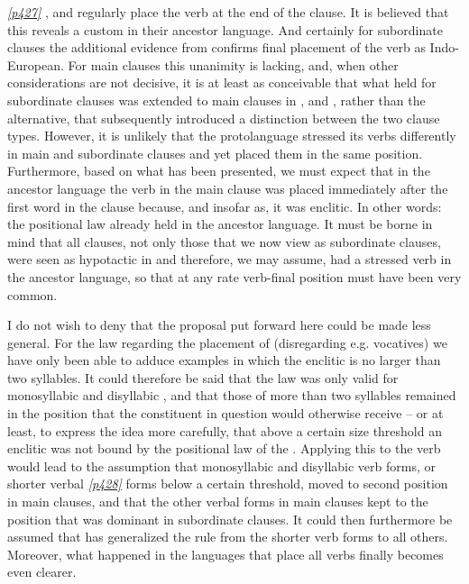 \hyperlink{p427}{\emph{[p427]}} ,  and  regularly place the verb at the end of the clause. It is believed that this reveals a custom in their ancestor language. And certainly for subordinate clauses the additional evidence from  confirms final placement of the verb as Indo-European. For main clauses this unanimity is lacking, and, when other considerations are not decisive, it is at least as conceivable that what held for subordinate clauses was extended to main clauses in ,  and , rather than the alternative, that  subsequently introduced a distinction between the two clause types. However, it is unlikely that the protolanguage stressed its verbs differently in main and subordinate clauses and yet placed them in the same position. Furthermore, based on what has been presented, we must expect that in the ancestor language the verb in the main clause was placed immediately after the first word in the clause because, and insofar as, it was enclitic. In other words: the  positional law already held in the ancestor language. It must be borne in mind that all clauses, not only those that we now view as subordinate clauses, were seen as hypotactic in  and therefore, we may assume, had a stressed verb in the ancestor language, so that at any rate verb-final position must have been very common.

I do not wish to deny that the proposal put forward here could be made less general. For the law regarding the placement of  (disregarding e.g. vocatives) we have only been able to adduce examples in which the enclitic is no larger than two syllables. It could therefore be said that the law was only valid for monosyllabic and disyllabic , and that those of more than two syllables remained in the position that the constituent in question would otherwise receive -- or at least, to express the idea more carefully, that above a certain size threshold an enclitic was not bound by the positional law of the . Applying this to the verb would lead to the assumption that monosyllabic and disyllabic verb forms, or shorter verbal \hyperlink{p428}{\emph{[p428]}} forms below a certain threshold, moved to second position in main clauses, and that the other verbal forms in main clauses kept to the position that was dominant in subordinate clauses. It could then furthermore be assumed that  has generalized the rule from the shorter verb forms to all others. Moreover, what happened in the languages that place all verbs finally becomes even clearer.

